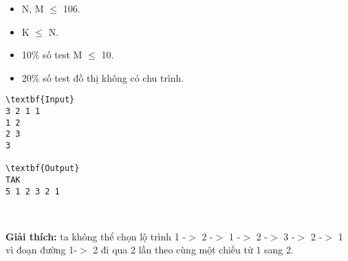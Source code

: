 \begin{itemize}
	\item N, M  $\le$  106.
	\item K  $\le$  N.
	\item 10\% số test M  $\le$  10.
	\item 20\% số test đồ thị không có chu trình.
\end{itemize}
\begin{verbatim}
\textbf{Input}
3 2 1 1
1 2
2 3
3

\textbf{Output}
TAK
5 1 2 3 2 1\end{verbatim}

 

\textbf{Giải thích:} ta không thể chọn lộ trình 1 -$>$ 2 -$>$ 1 -$>$ 2 -$>$ 3 -$>$ 2 -$>$ 1 vì đoạn đường 1-$>$ 2 đi qua 2 lần theo cùng một chiều từ 1 sang 2.